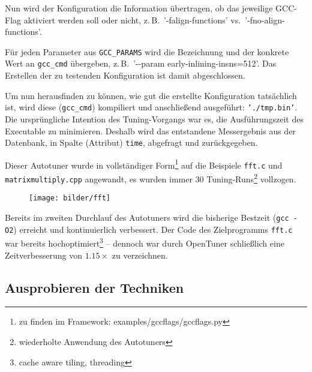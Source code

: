 \documentclass[a4paper,11pt]{scrartcl}
\newcommand{\zB}{\mbox{z.\,B.}\xspace}
\newcommand{\vs}{\mbox{vs.}\xspace}
\begin{document}

Nun wird der Konfiguration die Information übertragen, ob das jeweilige GCC-Flag
aktiviert werden soll oder nicht, \zB~'-falign-functions' \vs~'-fno-align-functions'.


Für jeden Parameter aus \texttt{GCC\_PARAMS} wird die Bezeichnung und der
konkrete Wert an \texttt{gcc\_cmd} übergeben, \zB~'-{}-param early-inlining-insns=512'.
Das Erstellen der zu testenden Konfiguration ist damit abgeschlossen. \newline


Um nun herausfinden zu können, wie gut die erstellte Konfiguration tatsächlich ist, 
wird diese (\texttt{gcc\_cmd}) kompiliert und anschließend ausgeführt: \texttt{'./tmp.bin'}.
Die ursprüngliche Intention des Tuning-Vorgangs war es, die Ausführungszeit des 
Executable zu minimieren. Deshalb wird das entstandene Messergebnis aus der Datenbank,
in Spalte (Attribut) \texttt{time}, abgefragt und zurückgegeben. \newline

Dieser Autotuner wurde in vollständiger Form\footnote{zu finden im Framework: 
examples/gccflags/gccflags.py} auf die Beispiele \texttt{fft.c} 
und \texttt{matrixmultiply.cpp} angewandt, es wurden immer 30 Tuning-Runs\footnote{wiederholte Anwendung 
des Autotuners} vollzogen.

\begin{figure}[h]
\begin{center}
\texttt{[image: bilder/fft]}
\cite{OT-paper}
\end{center}
\end{figure}

Bereits im zweiten Durchlauf des Autotuners wird die bisherige Bestzeit (\texttt{gcc -O2}) 
erreicht und kontinuierlich verbessert. Der Code des Zielprogramms \texttt{fft.c} war bereits
hochoptimiert\footnote{cache aware tiling, threading} -- dennoch war durch OpenTuner schließlich
eine Zeitverbesserung von $1.15 \times$  zu verzeichnen.




\subsection{Ausprobieren der Techniken}

\end{document}

